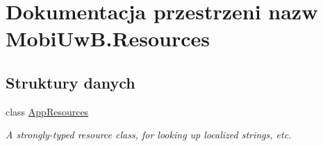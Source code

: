 \hypertarget{a00271}{}\section{Dokumentacja przestrzeni nazw Mobi\+Uw\+B.\+Resources}
\label{a00271}
\subsection*{Struktury danych}
\begin{DoxyCompactItemize}
\item 
class \hyperlink{a00006}{App\+Resources}
\begin{DoxyCompactList}\small\item\em A strongly-\/typed resource class, for looking up localized strings, etc. \end{DoxyCompactList}\end{DoxyCompactItemize}
